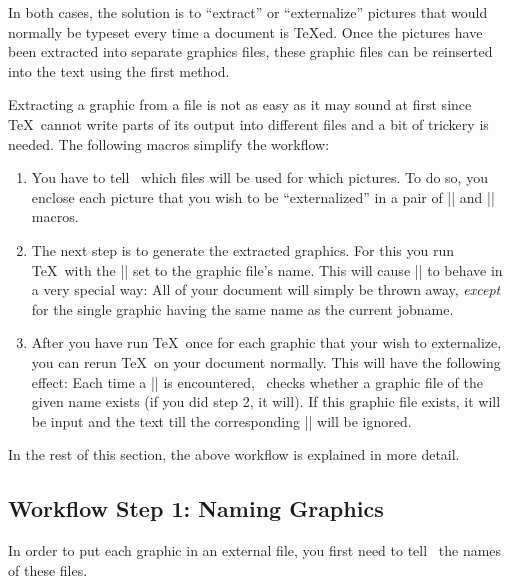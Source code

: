In both cases, the solution is to ``extract'' or ``externalize'' pictures that
would normally be typeset every time a document is \TeX ed. Once the pictures
have been extracted into separate graphics files, these graphic files can be
reinserted into the text using the first method.

Extracting a graphic from a file is not as easy as it may sound at first since
\TeX\ cannot write parts of its output into different files and a bit of
trickery is needed. The following macros simplify the workflow:
%
\begin{enumerate}
    \item You have to tell \pgfname\ which files will be used for which
        pictures. To do so, you enclose each picture that you wish to be
        ``externalized'' in a pair of |\beginpgfgraphicnamed| and
        |\endpgfgraphicnamed| macros.
    \item The next step is to generate the extracted graphics. For this you run
        \TeX\ with the |\jobname| set to the graphic file's name. This will
        cause |\pgfname| to behave in a very special way: All of your document
        will simply be thrown away, \emph{except} for the single graphic having
        the same name as the current jobname.
    \item After you have run \TeX\ once for each graphic that your wish to
        externalize, you can rerun \TeX\ on your document normally. This will
        have the following effect: Each time a |\beginpgfgraphicnamed| is
        encountered, \pgfname\ checks whether a graphic file of the given name
        exists (if you did step 2, it will). If this graphic file exists, it
        will be input and the text till the corresponding |\endpgfgraphicnamed|
        will be ignored.
\end{enumerate}

In the rest of this section, the above workflow is explained in more detail.


\subsection{Workflow Step 1: Naming Graphics}

In order to put each graphic in an external file, you first need to tell
\pgfname\ the names of these files.

